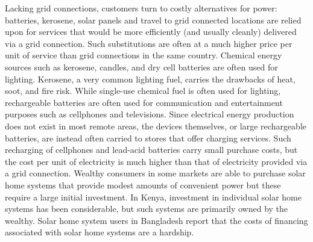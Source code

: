 \documentclass{sig-alternate}
\begin{document}
Lacking grid connections, customers turn to costly alternatives for
power: batteries, kerosene, solar panels and travel to grid connected
locations are relied upon for services that would be more efficiently
(and usually cleanly) delivered via a grid connection.
Such substitutions are often at a much higher price per unit of service
than grid connections in the same country.\cite{Mills:Specter,
Dutt:2004, vanderPlas:1988}
Chemical energy sources such as kerosene, candles, and dry cell batteries
are often used for lighting.
Kerosene, a very common lighting fuel, carries the drawbacks of heat,
soot, and fire risk.
While single-use chemical fuel is often used for lighting, rechargeable
batteries are often used for communication and entertainment purposes
such as cellphones and televisions.
Since electrical energy production does not exist in most remote areas,
the devices themselves, or large rechargeable batteries, are instead
often carried to stores that offer charging services.
Such recharging of cellphones and lead-acid batteries carry small
purchase costs, but the cost per unit of electricity is much higher than
that of electricity provided via a grid connection.
Wealthy consumers in some markets are able to purchase
solar home systems that provide modest amounts of convenient
power but these require a large initial investment.
In Kenya, investment in individual solar home systems has been
considerable, but such systems are primarily owned by the
wealthy.\cite{Jacobson:Connective}
Solar home system users in Bangladesh report that the costs of financing
associated with solar home systems are a hardship.
\cite{Mondal:SHSBangladesh:2011}
\end{document}
